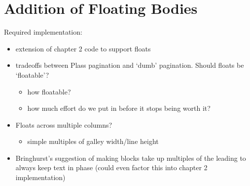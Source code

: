 \cleardoublepage
\chapter{Addition of Floating Bodies}\label{ch:floats}

Required implementation:
\begin{itemize}
    \item extension of chapter 2 code to support floats
    \item tradeoffs between Plass\cite{Plass1981} pagination and `dumb' pagination. Should floats be
    `floatable'?
    \begin{itemize}
        \item how floatable?
        \item how much effort do we put in before it stops being worth it?
    \end{itemize}
    \item Floats across multiple columns?
    \begin{itemize}
        \item simple multiples of galley width/line height
    \end{itemize}
    \item Bringhurst's suggestion\cite{Bringhurst2008} of making blocks take up multiples of the
    leading to always keep text in phase (could even factor this into chapter 2 implementation)

\end{itemize}
